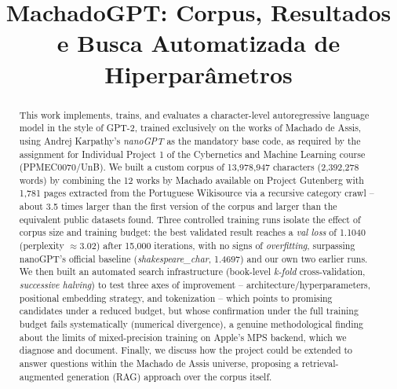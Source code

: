 \documentclass[conference]{IEEEtran}
\begin{document}
\title{MachadoGPT: Corpus, Resultados e Busca Automatizada de Hiperparâmetros}

\author{
}

\maketitle

\begin{abstract}
This work implements, trains, and evaluates a character-level autoregressive
language model in the style of GPT-2, trained exclusively on the works of
Machado de Assis, using Andrej Karpathy's \textit{nanoGPT} as the mandatory
base code, as required by the assignment for Individual Project 1 of the
Cybernetics and Machine Learning course (PPMEC0070/UnB). We built a custom
corpus of 13,978,947 characters (2,392,278 words) by combining the 12 works
by Machado available on Project Gutenberg with 1,781 pages extracted from
the Portuguese Wikisource via a recursive category crawl -- about 3.5 times
larger than the first version of the corpus and larger than the equivalent
public datasets found. Three controlled training runs isolate the effect of
corpus size and training budget: the best validated result reaches a
\textit{val loss} of 1.1040 (perplexity $\approx 3.02$) after 15,000
iterations, with no signs of \textit{overfitting}, surpassing nanoGPT's
official baseline (\textit{shakespeare\_char}, 1.4697) and our own two
earlier runs. We then built an automated search infrastructure (book-level
\textit{k-fold} cross-validation, \textit{successive halving}) to test three
axes of improvement -- architecture/hyperparameters, positional embedding
strategy, and tokenization -- which points to promising candidates under a
reduced budget, but whose confirmation under the full training budget fails
systematically (numerical divergence), a genuine methodological finding
about the limits of mixed-precision training on Apple's MPS backend, which
we diagnose and document. Finally, we discuss how the project could be
extended to answer questions within the Machado de Assis universe,
proposing a retrieval-augmented generation (RAG) approach over the corpus
itself.
\end{abstract}
\end{document}
